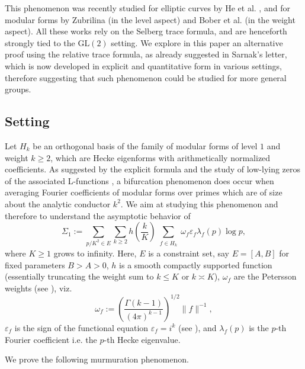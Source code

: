 \documentclass[reqno, 12pt]{amsart}
\newcommand{\GL}{\mathrm{GL}}
\begin{document}
This phenomenon was recently studied for elliptic curves by He et al. \cite{he_murmurations_2023}, and for modular forms by Zubrilina \cite{zubrilina_murmurations_2023} (in the level aspect) and Bober et al. \cite{bober_murmurations_2023} (in the weight aspect). All these works rely on the Selberg trace formula, and are henceforth strongly tied to the $\GL(2)$ setting. We explore in this paper an alternative proof using the relative trace formula, as already suggested in Sarnak's letter, which is now developed in explicit and quantitative form in various settings, therefore suggesting that such phenomenon could be studied for more general groups.

\subsection{Setting}

Let $H_k$ be an orthogonal basis of the family of modular forms of level $1$ and weight $k \geqslant 2$, which are Hecke eigenforms with arithmetically normalized coefficients. As suggested by the explicit formula and the study of low-lying zeros of the associated L-functions \cite{iwaniec_low_2000}, a bifurcation phenomenon does occur when averaging Fourier coefficients of modular forms over primes which are of size about the analytic conductor $k^2$. We aim at studying this phenomenon and therefore to understand the asymptotic behavior of 
\begin{equation}
\label{sigma}
\Sigma_1 := \sum_{p/K^2 \in E} \sum_{k \geqslant 2} h\left( \frac{k}{K}\right) \sum_{\substack{f \in H_k}} \omega_f \varepsilon_f \lambda_f(p) \log p,
\end{equation}
where $K \geqslant 1$ grows to infinity. Here, $E$ is a constraint set, say $E=[A,B]$ for fixed parameters $B>A>0$,  $h$ is a smooth compactly supported function (essentially truncating the weight sum to $k \leqslant K$ or $k \asymp K$), $\omega_f$ are the Petersson weights (see \cite[(2.3)]{iwaniec_low_2000}), viz.
\begin{equation}
\omega_f  := \left(\frac{\Gamma(k-1)}{(4\pi)^{k-1}}\right)^{1/2}\|f\|^{-1},
\end{equation}
 $\varepsilon_f$ is the sign of the functional equation $\varepsilon_f = i^k$ (see \cite[(3.5)]{iwaniec_low_2000}), and $\lambda_f(p)$ is the $p$-th Fourier coefficient i.e. the $p$-th Hecke eigenvalue.
 
We prove the following murmuration phenomenon.
 
\end{document}
